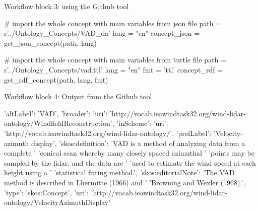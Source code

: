 \documentclass[remotesensing,article,submit,pdftex,moreauthors]{Definitions/mdpi}
\begin{document}
\begin{tcolorbox}
    Workflow block 3: using the Github tool
    \begin{python}
    # import the whole concept with main variables from json file
    path = r'../Ontology_Concepts/VAD_da'
    lang = "en"
    concept_json = get_json_concept(path, lang)

    # import the whole concept with main variables from turtle file
    path = r'../Ontology_Concepts/vad.ttl'
    lang = "en"
    fmt = 'ttl'
    concept_rdf = get_rdf_concept(path, lang, fmt)
\end{python}
\end{tcolorbox}

\begin{tcolorbox}
    Workflow block 4: Output from the Github tool
    \begin{python}
    {   'altLabel': 'VAD',
    'broader': {   'uri': 'http://vocab.ieawindtask32.org/wind-lidar-ontology/WindfieldReconstruction'},
    'inScheme': {'uri': 'http://vocab.ieawindtask32.org/wind-lidar-ontology/'},
    'prefLabel': 'Velocity-azimuth display',
    'skos:definition': 'VAD is a method of analyzing data from a complete '
                       'conical scan whereby many closely spaced azimuthal '
                       'points may be sampled by the lidar, and the data are '
                       'used to estimate the wind speed at each height using a '
                       'statistical fitting method.',
    'skos:editorialNote': 'The VAD method is described in Lhermitte (1966) and '
                          'Browning and Wexler (1968).',
    'type': 'skos:Concept',
    'uri': 'http://vocab.ieawindtask32.org/wind-lidar-ontology/VelocityAzimuthDisplay'}
\end{python}
\end{tcolorbox}
\end{document}
